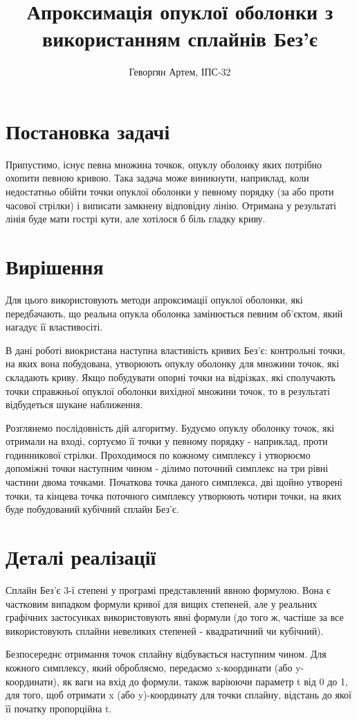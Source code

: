 \documentclass{article}
\title{Апроксимація опуклої оболонки з використанням сплайнів Без'є}
\author{Геворгян Артем, ІПС-32}
\begin{document}
\maketitle
{}
\newpage
{}

\section{Постановка задачі}

Припустимо, існує певна множина точкок, опуклу оболонку яких потрібно
охопити певною кривою. Така задача може виникнути, наприклад, коли
недостатньо обійти точки опуклої оболонки у певному порядку (за або проти
часової стрілки) і виписати замкнену відповідну лінію. Отримана у
результаті лінія буде мати гострі кути, але хотілося б біль гладку криву.

\section{Вирішення}

Для цього використовують методи апроксимації опуклої оболонки, які
передбачають, що реальна опукла оболонка замінюється певним об'єктом, який
нагадує її властивосіті.

В дані роботі виокристана наступна властивість кривих Без'є: контрольні
точки, на яких вона побудована, утворюють опуклу оболонку для множини
точок, які складають криву. Якщо побудувати опорні точки на відрізках,
які сполучають точки справжньої опуклої оболонки вихідної множини точок,
то в результаті відбудеться шукане наближення.

Розглянемо послідовність дій алгоритму. Будуємо опуклу оболонку точок,
які отримали на вході, сортуємо її точки у певному порядку - наприклад,
проти годинникової стрілки. Проходимося по кожному симплексу і утворюємо
допоміжні точки наступним чином - ділимо поточний симплекс на три рівні
частини двома точками. Початкова точка даного симплекса, дві щойно
утворені точки, та кінцева точка поточного симплексу утворюють чотири
точки, на яких буде побудований кубічний сплайн Без'є.

\section{Деталі реалізації}

Сплайн Без'є 3-ї степені у програмі представлений явною формулою. Вона є
частковим випадком формули кривої для вищих степеней, але у реальних
графічних застосунках використовують явні формули (до того ж, частіше за
все використовують сплайни невеликих степеней - квадратичний чи кубічний).

Безпосереднє отримання точок сплайну відбувається наступним чином. Для
кожного симплексу, який обробляємо, передаємо x-координати (або
y-координати), як ваги на вхід до формули, також варіюючи параметр t від
0 до 1, для того, щоб отримати x (або y)-координату для точки сплайну,
відстань до якої її початку пропорційна t.
\end{document}
